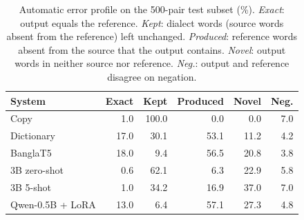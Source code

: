 \begin{table}[t]\centering\footnotesize
\begin{tabular}{@{}lrrrrr@{}}\toprule
System & Exact & Kept & Produced & Novel & Neg.\\\midrule
Copy & 1.0 & 100.0 & 0.0 & 0.0 & 7.0\\
Dictionary & 17.0 & 30.1 & 53.1 & 11.2 & 4.2\\
BanglaT5 & 18.0 & 9.4 & 56.5 & 20.8 & 3.8\\
3B zero-shot & 0.6 & 62.1 & 6.3 & 22.9 & 5.8\\
3B 5-shot & 1.0 & 34.2 & 16.9 & 37.0 & 7.0\\
Qwen-0.5B + LoRA & 13.0 & 6.4 & 57.1 & 27.3 & 4.8\\
\bottomrule\end{tabular}
\caption{Automatic error profile on the 500-pair test subset (\%). \emph{Exact}: output equals the reference. \emph{Kept}: dialect words (source words absent from the reference) left unchanged. \emph{Produced}: reference words absent from the source that the output contains. \emph{Novel}: output words in neither source nor reference. \emph{Neg.}: output and reference disagree on negation.}\label{tab:errors}
\end{table}
